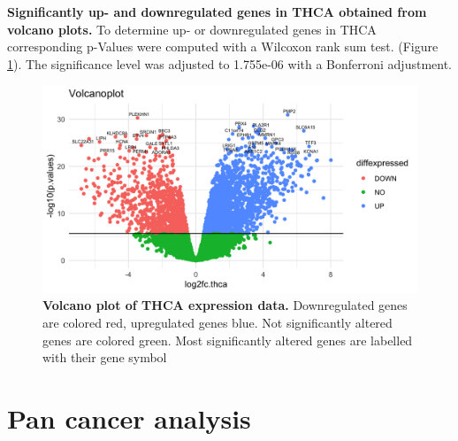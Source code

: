 \documentclass[
  11pt,
  parskip,
  oneside]{scrreprt}
\begin{document}
\textbf{Significantly up- and downregulated genes in THCA obtained from
volcano plots.} To determine up- or downregulated genes in THCA
corresponding p-Values were computed with a Wilcoxon rank sum test.
(Figure \ref{fig:showvolcanoplot}). The significance level was adjusted
to 1.755e-06 with a Bonferroni adjustment.

\begin{figure}

{\centering \includegraphics[width=0.9\linewidth]{figures/Volcanoplot} 

}

\caption{\textbf{Volcano plot of THCA expression data.} Downregulated genes are colored red, upregulated genes blue. Not significantly altered genes are colored green. Most significantly altered genes are labelled with their gene symbol}\label{fig:showvolcanoplot}
\end{figure}

\hypertarget{pan-cancer-analysis}{%
\section{Pan cancer analysis}\label{pan-cancer-analysis}}
\end{document}
